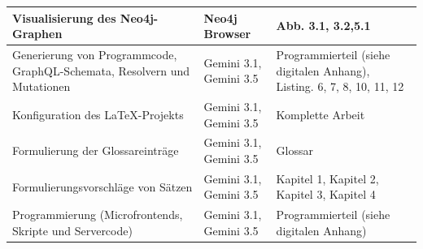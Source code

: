 \begin{table}[H]
\begin{tabularx}{\textwidth}{LLL}
    Visualisierung des Neo4j-Graphen                            & Neo4j Browser                                                        & Abb. 3.1, 3.2,5.1                                                                                     \\ \hline
    Generierung von Programmcode, GraphQL-Schemata, Resolvern und Mutationen & Gemini 3.1, Gemini 3.5                                               & Programmierteil (siehe digitalen Anhang), Listing. 6, 7, 8, 10, 11, 12                                 \\ \hline
    Konfiguration des LaTeX-Projekts                            & Gemini 3.1, Gemini 3.5                                               & Komplette Arbeit                                                                                       \\ \hline
    Formulierung der Glossareinträge                            & Gemini 3.1, Gemini 3.5                                               & Glossar                                                                                                \\ \hline
    Formulierungsvorschläge von Sätzen                          & Gemini 3.1, Gemini 3.5                                               & Kapitel 1, Kapitel 2, Kapitel 3, Kapitel 4                                                             \\ \hline
    Programmierung (Microfrontends, Skripte und Servercode)     & Gemini 3.1, Gemini 3.5                                               & Programmierteil (siehe digitalen Anhang)                                                               \\ \hline

    \bottomrule
  \end{tabularx}
\end{table}

\newpage
